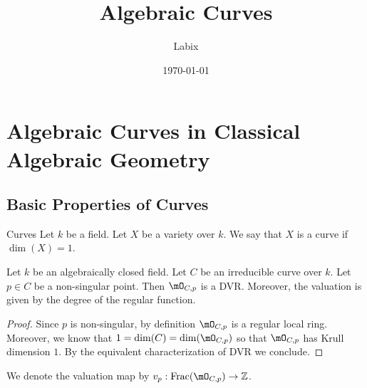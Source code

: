 \documentclass[a4paper]{article}
\title{Algebraic Curves}
\author{Labix}
\date{\today}
\begin{document}
\maketitle
\begin{abstract}
\end{abstract}
\pagebreak
\tableofcontents
\pagebreak

\section{Algebraic Curves in Classical Algebraic Geometry}
\subsection{Basic Properties of Curves}
\begin{defn}{Curves}{} Let $k$ be a field. Let $X$ be a variety over $k$. We say that $X$ is a curve if $\dim(X)=1$. 
\end{defn}

\begin{prp}{}{} Let $k$ be an algebraically closed field. Let $C$ be an irreducible curve over $k$. Let $p\in C$ be a non-singular point. Then $\mO_{C,p}$ is a DVR. Moreover, the valuation is given by the degree of the regular function. 
\begin{proof}
Since $p$ is non-singular, by definition $\mO_{C,p}$ is a regular local ring. Moreover, we know that $1=\dim(C)=\dim(\mO_{C,p})$ so that $\mO_{C,p}$ has Krull dimension $1$. By the equivalent characterization of DVR we conclude. 
\end{proof}
\end{prp}

We denote the valuation map by $v_p:\text{Frac}(\mO_{C,p})\to\Z$. 
\end{document}
